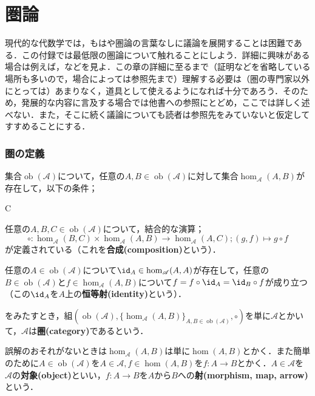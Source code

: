 \part[Appendix \thepart, Category theory]{圏論}\label{chap:cat}%

現代的な代数学では，もはや圏論の言葉なしに議論を展開することは困難である．この付録では最低限の圏論について触れることにしよう．詳細に興味がある場合は例えば\cite{MacLane1998}，\cite{Shiho2016}などを見よ．この章の詳細に至るまで（証明などを省略している場所も多いので，場合によっては参照先まで）理解する必要は（圏の専門家以外にとっては）あまりなく，道具として使えるようになれば十分であろう．そのため，発展的な内容に言及する場合では他書への参照にとどめ，ここでは詳しく述べない．また，そこに続く議論についても読者は参照先をみていないと仮定してすすめることにする．

\section{圏の定義}

\begin{defi}[圏]
	集合$\operatorname{ob}(\mathscr{A})$について，任意の$A,B\in\operatorname{ob}(\mathscr{A})$に対して集合$\hom_{\mathscr{A}}(A,B)$が存在して，以下の条件；
	\begin{defiterm}{C}
		\item 任意の$A,B,C\in\operatorname{ob}(\mathscr{A})$について，結合的な演算；
		\[\circ:\hom_{\mathscr{A}}(B,C)\times\hom_{\mathscr{A}}(A,B)\to\hom_{\mathscr{A}}(A,C);(g,f)\mapsto g\circ f\]
		が定義されている（これを\textbf{合成(composition)}という）．
		\item 任意の$A\in\operatorname{ob}(\mathscr{A})$について$\id_A\in\hom_{\mathscr{A}}(A,A)$が存在して，任意の$B\in\operatorname{ob}(\mathscr{A})$と$f\in\hom_{\mathscr{A}}(A,B)$について$f=f\circ\id_A=\id_B\circ f$が成り立つ（この$\id_A$を$A$上の\textbf{恒等射(identity)}という）．
	\end{defiterm}
	をみたすとき，組$(\operatorname{ob}(\mathscr{A}),\{\hom_{\mathscr{A}}(A,B)\}_{A,B\in\operatorname{ob}(\mathscr{A})},\circ)$を単に$\mathscr{A}$とかいて，$\mathscr{A}$は\textbf{圏(category)}であるという．
\end{defi}

誤解のおそれがないときは$\hom_{\mathscr{A}}(A,B)$は単に$\hom(A,B)$とかく．また簡単のために$A\in\operatorname{ob}(\mathscr{A})$を$A\in\mathscr{A},f\in\hom(A,B)$を$f:A\to B$とかく．$A\in\mathscr{A}$を$\mathscr{A}$の\textbf{対象(object)}といい，$f:A\to B$を$A$から$B$への\textbf{射(morphism, map, arrow)}という．


